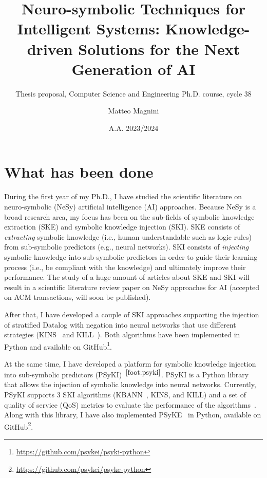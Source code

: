 \documentclass[]{scrartcl}
\title{
    Neuro-symbolic Techniques for Intelligent Systems:
    Knowledge-driven Solutions for the Next Generation of AI
}
\subtitle{Thesis proposal, Computer Science and Engineering Ph.D. course, cycle 38}
\author{Matteo Magnini}
\date{A.A. 2023/2024}
\begin{document}
    
    \maketitle
    
    \begin{abstract}

        
    \end{abstract}
    
    \section{What has been done}
    \label{sec:done}

    During the first year of my Ph.D., I have studied the scientific literature on neuro-symbolic (NeSy) artificial intelligence (AI) approaches.
    Because NeSy is a broad research area, my focus has been on the sub-fields of symbolic knowledge extraction (SKE) and symbolic knowledge injection (SKI).
    SKE consists of \emph{extracting} symbolic knowledge (i.e., human understandable such as logic rules) from sub-symbolic predictors (e.g., neural networks).
    SKI consists of \emph{injecting} symbolic knowledge into sub-symbolic predictors in order to guide their learning process (i.e., be compliant with the knowledge) and ultimately improve their performance.
    The study of a huge amount of articles about SKE and SKI will result in a scientific literature review paper on NeSy approaches for AI (accepted on ACM transactions, will soon be published).

    After that, I have developed a couple of SKI approaches supporting the injection of stratified Datalog with negation into neural networks that use different strategies (KINS~\cite{kins-cilc2022} and KILL~\cite{kill-woa2022}).
    Both algorithms have been implemented in Python and available on GitHub\footnote{\label{foot:psyki}\url{https://github.com/psykei/psyki-python}}.

    At the same time, I have developed a platform for symbolic knowledge injection into sub-symbolic predictors (PSyKI)~\cite{psyki-extraamas2022}$^{\ref{foot:psyki}}$.
    PSyKI is a Python library that allows the injection of symbolic knowledge into neural networks.
    Currently, PSyKI supports 3 SKI algorithms (KBANN~\cite{TowellAaai1990}, KINS, and KILL) and a set of quality of service (QoS) metrics to evaluate the performance of the algorithms~\cite{skiqos-jaamas37}.
    Along with this library, I have also implemented PSyKE~\cite{psyke-woa2021} in Python, available on GitHub\footnote{\label{foot:psyke}\url{https://github.com/psykei/psyke-python}}.
\end{document}
